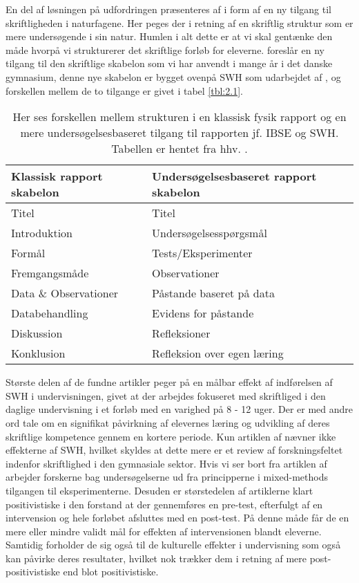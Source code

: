 En del af løsningen på udfordringen præsenteres af \citep{Keys1999, Burke2005} i form af en ny tilgang til skriftligheden i naturfagene. Her peges der i retning af en skriftlig struktur som er mere undersøgende i sin natur. Humlen i alt dette er at vi skal gentænke den måde hvorpå vi strukturerer det skriftlige forløb for eleverne. \citet{Burke2005} foreslår en ny tilgang til den skriftlige skabelon som vi har anvendt i mange år i det danske gymnasium, denne nye skabelon er bygget ovenpå SWH som udarbejdet af \citep{Keys1999}, og forskellen mellem de to tilgange er givet i tabel \vref{tbl:2.1}.

\begin{table}
	\centering
	\caption{ Her ses forskellen mellem strukturen i en klassisk fysik rapport og en mere undersøgelsesbaseret tilgang til rapporten jf. IBSE og SWH. Tabellen er hentet fra hhv. 
	\citet{Burke2005, Keys1999}.}
	\label{tbl:2.1}
	\begin{tabular}{@{ } l l @{ }}
		\toprule[2.5pt]
			Klassisk rapport  skabelon & Undersøgelsesbaseret rapport skabelon\\
		\midrule[1.25pt]
			Titel				&	Titel\\
			Introduktion			&	Undersøgelsesspørgsmål\\
			Formål			& 	Tests/Eksperimenter\\
			Fremgangsmåde		&	Observationer\\
			Data \& Observationer	&	Påstande baseret på data\\
			Databehandling		&	Evidens for påstande\\
			Diskussion			&	Refleksioner\\
			Konklusion			&	Refleksion over egen læring\\
		\bottomrule[2.5pt]
	\end{tabular}
\end{table}

Største delen af de fundne artikler peger på en målbar effekt af indførelsen af SWH i undervisningen, givet at der arbejdes fokuseret med skriftliged i den daglige undervisning i et forløb med en varighed på 8 - 12 uger. Der er med andre ord tale om en signifikat påvirkning af elevernes læring og udvikling af deres skriftlige kompetence gennem en kortere periode. Kun artiklen af \citep{Miller2018} nævner ikke effekterne af SWH, hvilket skyldes at dette mere er et review af forskningsfeltet indenfor skriftlighed i den gymnasiale sektor. Hvis vi ser bort fra artiklen af \citep{Miller2018, Dolin2014, Krogh2016} arbejder forskerne bag undersøgelserne ud fra principperne i mixed-methods tilgangen til eksperimenterne. Desuden er størstedelen af artiklerne klart positivistiske i den forstand at der gennemføres en pre-test, efterfulgt af en intervension og hele forløbet afsluttes med en post-test. På denne måde får de en mere eller mindre validt mål for effekten af intervensionen blandt eleverne. Samtidig forholder de sig også til de kulturelle effekter i undervisning som også kan påvirke deres resultater, hvilket nok trækker dem i retning af mere post-positivistiske end blot positivistiske.


